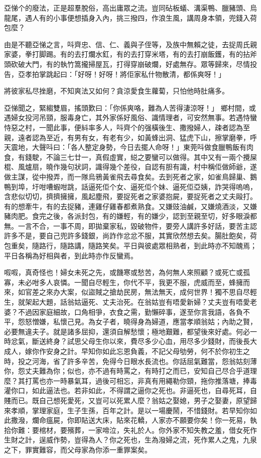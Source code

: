 \documentclass[a5paper, 12pt, openany]{book} %
\begin{document}
	亞悌个的廢法，正是超羣脫俗，高出庸眾之流。豈同砧板蟻、溝渠鴨、臘豬頭、烏龍尾，遇人有的小事便想插身入內，挑三撥四，作浪生風，講周身本領，兜錢入荷包麼？

	由是不聽亞悌之言，呌齊忠、信、仁、義與子侄等，及族中無賴之徒，去捉周氏親家婆，拳打脚踢。有的去打爛水釭，有的去打穿米塔，有的去打崩飯鑊，有的拈斧頭砍破大門，有的執竹篙攏掃屋瓦，打得穿崩破爛，好處無存。眾等歸來，尽情投告，亞孝拍掌跳起曰：「好呀！好呀！將佢家私什物散清，都係爽呀！」

	將彼家私尽挫磨，不知爽法又如何？貪涼愛食生蘿蔔，只怕他時肚痛多。

	亞悌聞之，緊縐雙眉，搖頭歎曰：「你係爽咯，難為人苦得淒涼呀！」 鄉村間，或遇婦女投河吊頸，服毒身亡，其外家係好風俗、識情理者，可安然無事。若遇恃蠻恃惡之村，一聞此事，便紏率多人，呌齊个的强橫後生、撒撥婦人，疎者認為至親，遠者認為至近，有男有女，有老有少，如黃蜂出洞、猛虎下山，擦掌磨拳，呼天震地，大聲呌曰：「各人整定身勢，今日去擺人命呀！」東莞呌做食臘鴨飯有肉食，有錢駛，不論三七廿一，真假虛實，縂之要蠻可以做得。其中又有一兩个攪屎棍、風爐扇，曉作幾句狀詞，識得幾个差役，自認有胆有識，村中稱佢做師爺，遂做主謀，從中撥弄，而一隊烏鴉黃雀飛去尋食矣。去到死者之家，如雀鳥歸巢、鵝鴨到埠，圩咁嘈蝦咁跳，話逼死佢个女、逼死佢个妹、逼死佢亞姨，詐哭得嗚嗚，含悲似切切，擠擠擁擁，風起塵飛，要捉死者之家婆抱屍，要捉死者之丈夫毆打。有的想牽牛，有的去捉豬，連雞仔雞春都煮熟食。又嫌豉油鹹，又嫌燒酒淡，又嫌豬肉肥。食完之後，各派封包，有的嫌輕，有的嫌少，認到至親至切，好多眼淚都無。一言不合，一事不周，即拋棄家私，毀破物件，要旁人講許多好話，要苦主認許多不是，要自己兜許多錢銀，尚詐作忿忿不服，其實欣然想去矣。腸肚飽矣，荷包重矣，隨路行，隨路講，隨路笑矣。平日與彼處眾相熟者，到此時亦不知醜焉；平日各稱為好相與者，到此時亦作反蠻焉。

	㗇㗇，真奇怪也！婦女未死之先，或饑寒或愁苦，為何無人來照顧？或死亡或孤寡，未必咁多人哀憐。一聞自尽輕生，你代不平，我更不服，虎威而至，蜂擁而來，如官差之來办大案，似盜賊之搶劫民房，無法無天，成何世界！獨不思自尽輕生，就架起大題，話翁姑逼死、丈夫治死。在翁姑豈有唔愛新婦？丈夫豈有唔愛老婆？不過因家庭細故，口角相爭，衣食之需，勤懶碎事，遂至你言我語，各負不平，怨怒憎嫌，私懷己見。為女子者，曉得身為婦道，應當孝順翁姑；內助之賢，必要無違夫子。就是諸多屈抑，還須自解愁懷；極地艱難，都望後來好處。何必一時忿氣，斷送終身？試思父母生你以來，費尽多少心血，用尽多少錢財，而後長大成人，嫁你作安身之計。早知你如此忘恩負義，不記父母劬勞，何不於你初生之時，投之河海，省了許多辛苦，免得今日眼水長流也。你話屈氣難當，怨翁姑刻薄你，怨丈夫難為你；似也，亦不過有時罵之，有時打之而已，安知自己尽合乎道理麼？其打罵也亦一時暴氣耳，過後可相忘，非真有用繩勒你頸，拖你推落塘，捧毒灌你口，如此逼法也。若非如此，不得謂之逼你之死也。非逼死也，自尋死耳，自賤而已。既自己想死愛死，又豈可以死累人麼？翁姑之娶媳，男子之娶妻，原望歸來孝順，掌理家庭，生子生孫，百年之計。是以一場慶鬧，不惜錢財。若早知你如此撒潑，爛命瘟屍，你即貼送大床，貼來花轎，人家亦不願要你矣！你一死易，執拾你難：要棺材，要殯葬，一家啼泣，失礼於人。你外家不知失教之羞，借女死作生財之計，逞威作勢，豈得為人？你之死也，生為潑婦之流，死作累人之鬼，九泉之下，罪實難容，而父母家為你添一重罪案矣。
\end{document}

